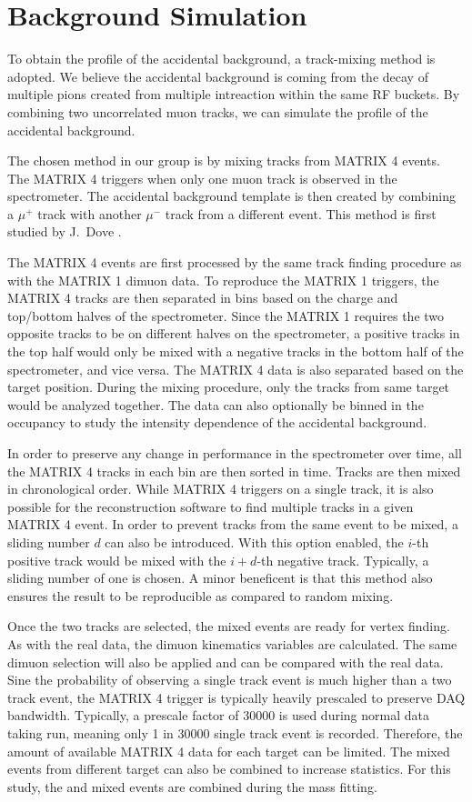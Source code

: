 \documentclass[../main.tex]{subfiles}
\begin{document}
\section{Background Simulation}
\label{sec:mixing}
To obtain the profile of the accidental background, a track-mixing method is adopted.
We believe the accidental background is coming from the decay of multiple pions created from multiple intreaction
within the same RF buckets. By combining two uncorrelated muon tracks, we can simulate the profile
of the accidental background.

The chosen method in our group is by mixing tracks from MATRIX 4 events. The MATRIX 4 triggers when
only one muon track is observed in the spectrometer.
The accidental background template is then created by combining a $\mu^+$ track with
another $\mu^-$ track from a different event. This method is first studied by
J.~Dove \cite{dove2020}.

The MATRIX 4 events are first processed by the same track finding procedure as with
the MATRIX 1 dimuon data.
To reproduce the MATRIX 1 triggers, the MATRIX 4 tracks are then separated in bins
based on the charge and top/bottom halves of the spectrometer. Since the MATRIX 1
requires the two opposite tracks to be on different halves on the spectrometer,
a positive tracks in the top half would only be mixed with a negative tracks in the
bottom half of the spectrometer, and vice versa. The MATRIX 4 data is also separated
based on the target position. During the mixing procedure, only the tracks from same
target would be analyzed together.
The data can also optionally be binned in the occupancy to study the intensity dependence
of the accidental background.

In order to preserve any change in performance in the spectrometer over time, all the
MATRIX 4 tracks in each bin are then sorted in time. Tracks are then mixed in chronological order.
While MATRIX 4 triggers on a single track, it is also
possible for the reconstruction software to find multiple tracks in a given MATRIX 4 event.
In order to prevent tracks from the same event to be mixed, a sliding number $d$ can also be introduced.
With this option enabled, the $i$-th positive track would be mixed with the $i+d$-th negative track.
Typically, a sliding number of one is chosen.
A minor beneficent is that this method also ensures the result to be reproducible as compared to random
mixing.

Once the two tracks are selected, the mixed events are ready for vertex finding. As with the
real data, the dimuon kinematics variables are calculated. The same dimuon selection will
also be applied and can be compared with the real data. Sine the probability of observing a
single track event is much higher than a two track event, the MATRIX 4 trigger is typically
heavily prescaled to preserve DAQ bandwidth. Typically, a prescale factor of \num{30000} is used during
normal data taking run, meaning only \num{1} in \num{30000} single track event is recorded.
Therefore, the amount of available MATRIX 4 data for each target can be limited. The mixed events
from different target can also be combined to increase statistics. For this study, the 
and  mixed events are combined during the mass fitting.
\end{document}
